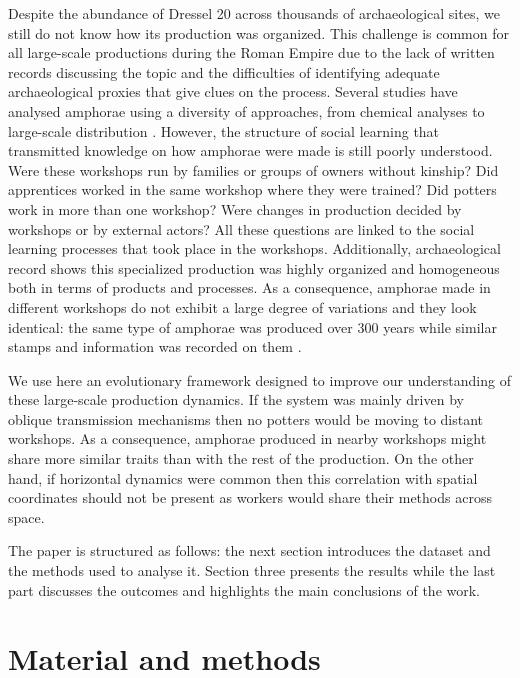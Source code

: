 \documentclass[review]{elsarticle}
\begin{document}
Despite the abundance of Dressel 20 across thousands of archaeological sites, we still do not know how its production was organized. This challenge is common for all large-scale productions during the Roman Empire due to the lack of written records discussing the topic and the difficulties of identifying adequate archaeological proxies that give clues on the process. Several studies have analysed amphorae using a diversity of approaches, from chemical analyses to large-scale distribution \citep{isaksen_network_2006,brughmans_roman_2016,coto-sarmiento_maria_bayesian_????}. However, the structure of social learning that transmitted knowledge on how amphorae were made is still poorly understood. Were these workshops run by families or groups of owners without kinship? Did apprentices worked in the same workshop where they were trained? Did potters work in more than one workshop? Were changes in production decided by workshops or by external actors? All these questions are linked to the social learning processes that took place in the workshops. Additionally, archaeological record shows this specialized production was highly organized and homogeneous both in terms of products and processes. As a consequence, amphorae made in different workshops do not exhibit a large degree of variations and they look identical: the same type of amphorae was produced over 300 years while similar stamps and information was recorded on them \citep{remesal_anforas_2004}.

We use here an evolutionary framework designed to improve our understanding of these large-scale production dynamics. If the system was mainly driven by oblique transmission mechanisms then no potters would be moving to distant workshops. As a consequence, amphorae produced in nearby workshops might share more similar traits than with the rest of the production. On the other hand, if horizontal dynamics were common then this correlation with spatial coordinates should not be present as workers would share their methods across space.

The paper is structured as follows: the next section introduces the dataset and the methods used to analyse it. Section three presents the results while the last part discusses the outcomes and highlights the main conclusions of the work. 

\section{Material and methods}
\end{document}
